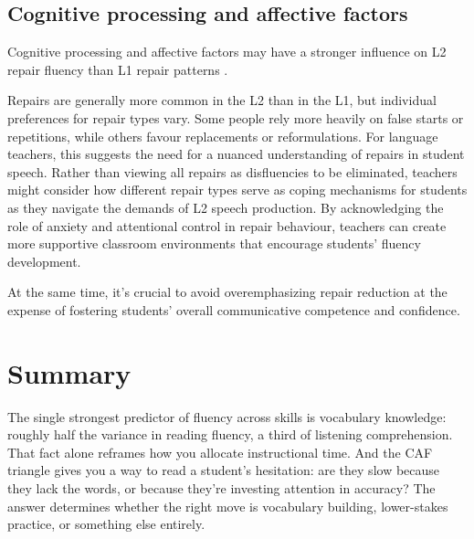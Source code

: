 \subsection{Cognitive processing and affective factors}

Cognitive processing and affective factors may have a stronger influence on L2 repair fluency than L1 repair patterns \citep{Peltonen2024}.

Repairs are generally more common in the L2 than in the L1, but individual preferences for repair types vary. Some people rely more heavily on false starts or repetitions, while others favour replacements or reformulations. For language teachers, this suggests the need for a nuanced understanding of repairs in student speech. Rather than viewing all repairs as disfluencies to be eliminated, teachers might consider how different repair types serve as coping mechanisms for students as they navigate the demands of L2 speech production. By acknowledging the role of anxiety and attentional control in repair behaviour, teachers can create more supportive classroom environments that encourage students' fluency development.

At the same time, it's crucial to avoid overemphasizing repair reduction at the expense of fostering students' overall communicative competence and confidence.

\section{Summary}

The single strongest predictor of fluency across skills is vocabulary knowledge: roughly half the variance in reading fluency, a third of listening comprehension. That fact alone reframes how you allocate instructional time. And the CAF triangle gives you a way to read a student's hesitation: are they slow because they lack the words, or because they're investing attention in accuracy? The answer determines whether the right move is vocabulary building, lower-stakes practice, or something else entirely.

